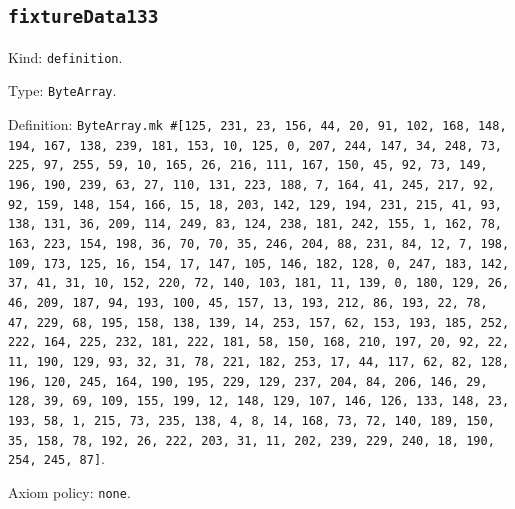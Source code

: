 \documentclass[11pt]{article}
\begin{document}
\subsection*{\texttt{fixtureData133}}
\noindent Kind: \texttt{definition}.\par
\noindent Type: \texttt{ByteArray}.\par
\noindent Definition: \texttt{ByteArray.mk \#[125, 231, 23, 156, 44, 20, 91, 102, 168, 148, 194, 167, 138, 239, 181, 153, 10, 125, 0, 207, 244, 147, 34, 248, 73, 225, 97, 255, 59, 10, 165, 26, 216, 111, 167, 150, 45, 92, 73, 149, 196, 190, 239, 63, 27, 110, 131, 223, 188, 7, 164, 41, 245, 217, 92, 92, 159, 148, 154, 166, 15, 18, 203, 142, 129, 194, 231, 215, 41, 93, 138, 131, 36, 209, 114, 249, 83, 124, 238, 181, 242, 155, 1, 162, 78, 163, 223, 154, 198, 36, 70, 70, 35, 246, 204, 88, 231, 84, 12, 7, 198, 109, 173, 125, 16, 154, 17, 147, 105, 146, 182, 128, 0, 247, 183, 142, 37, 41, 31, 10, 152, 220, 72, 140, 103, 181, 11, 139, 0, 180, 129, 26, 46, 209, 187, 94, 193, 100, 45, 157, 13, 193, 212, 86, 193, 22, 78, 47, 229, 68, 195, 158, 138, 139, 14, 253, 157, 62, 153, 193, 185, 252, 222, 164, 225, 232, 181, 222, 181, 58, 150, 168, 210, 197, 20, 92, 22, 11, 190, 129, 93, 32, 31, 78, 221, 182, 253, 17, 44, 117, 62, 82, 128, 196, 120, 245, 164, 190, 195, 229, 129, 237, 204, 84, 206, 146, 29, 128, 39, 69, 109, 155, 199, 12, 148, 129, 107, 146, 126, 133, 148, 23, 193, 58, 1, 215, 73, 235, 138, 4, 8, 14, 168, 73, 72, 140, 189, 150, 35, 158, 78, 192, 26, 222, 203, 31, 11, 202, 239, 229, 240, 18, 190, 254, 245, 87]}.\par
\noindent Axiom policy: \texttt{none}.\par
\end{document}
